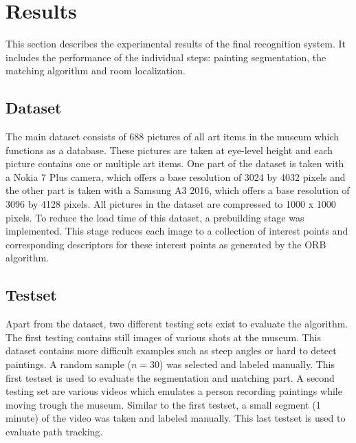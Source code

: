 \section{Results}
\label{sec:results}
This section describes the experimental results of the final recognition system. It includes the performance of the individual steps: painting segmentation, the matching algorithm and room localization. 


\subsection{Dataset}
The main dataset consists of 688 pictures of all art items in the museum which functions as a database. These pictures are taken at eye-level height and each picture contains one or multiple art items. One part of the dataset is taken with a Nokia 7 Plus camera, which offers a base resolution of 3024 by 4032 pixels and the other part is taken with a Samsung A3 2016, which offers a base resolution of 3096 by 4128 pixels. All pictures in the dataset are compressed to 1000 x 1000 pixels. To reduce the load time of this dataset, a prebuilding stage was implemented. This stage reduces each image to a collection of interest points and corresponding descriptors for these interest points as generated by the ORB \cite{Rublee2011} algorithm. 

\subsection{Testset}
Apart from the dataset, two different testing sets exist to evaluate the algorithm. The first testing contains still images of various shots at the museum. This dataset contains more difficult examples such as steep angles or hard to detect paintings. A random sample ($n = 30$) was selected and labeled manually. This first testset is used to evaluate the segmentation and matching part. A second testing set are various videos which emulates a person recording paintings while moving trough the museum. Similar to the first testset, a small segment (1 minute) of the video was taken and labeled manually. This last testset is used to evaluate path tracking.

